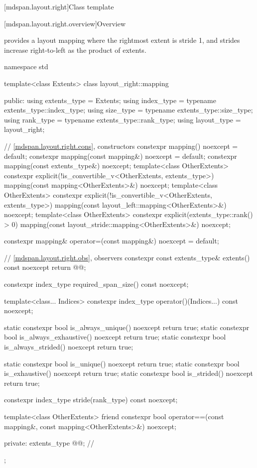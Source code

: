 [mdspan.layout.right]{Class template }

[mdspan.layout.right.overview]{Overview}

\pnum
{} provides a layout mapping
where the rightmost extent is stride 1, and
strides increase right-to-left as the product of extents.

\begin{codeblock}
namespace std {
  template<class Extents>
  class layout_right::mapping {
  public:
    using extents_type = Extents;
    using index_type = typename extents_type::index_type;
    using size_type = typename extents_type::size_type;
    using rank_type = typename extents_type::rank_type;
    using layout_type = layout_right;

    // \ref{mdspan.layout.right.cons}, constructors
    constexpr mapping() noexcept = default;
    constexpr mapping(const mapping&) noexcept = default;
    constexpr mapping(const extents_type&) noexcept;
    template<class OtherExtents>
      constexpr explicit(!is_convertible_v<OtherExtents, extents_type>)
        mapping(const mapping<OtherExtents>&) noexcept;
    template<class OtherExtents>
      constexpr explicit(!is_convertible_v<OtherExtents, extents_type>)
        mapping(const layout_left::mapping<OtherExtents>&) noexcept;
    template<class OtherExtents>
      constexpr explicit(extents_type::rank() > 0)
        mapping(const layout_stride::mapping<OtherExtents>&) noexcept;

    constexpr mapping& operator=(const mapping&) noexcept = default;

    // \ref{mdspan.layout.right.obs}, observers
    constexpr const extents_type& extents() const noexcept { return @@; }

    constexpr index_type required_span_size() const noexcept;

    template<class... Indices>
      constexpr index_type operator()(Indices...) const noexcept;

    static constexpr bool is_always_unique() noexcept { return true; }
    static constexpr bool is_always_exhaustive() noexcept { return true; }
    static constexpr bool is_always_strided() noexcept { return true; }

    static constexpr bool is_unique() noexcept { return true; }
    static constexpr bool is_exhaustive() noexcept { return true; }
    static constexpr bool is_strided() noexcept { return true; }

    constexpr index_type stride(rank_type) const noexcept;

    template<class OtherExtents>
      friend constexpr bool operator==(const mapping&, const mapping<OtherExtents>&) noexcept;

  private:
    extents_type @@{};    // \expos
  };
}
\end{codeblock}

